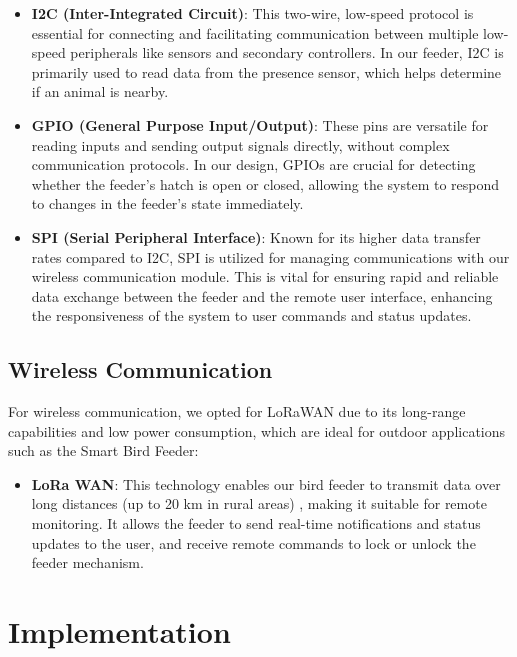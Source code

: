 \documentclass[12pt,a4paper]{article}
\begin{document}
    \begin{itemize}
        \item \textbf{I2C (Inter-Integrated Circuit)}: This two-wire, low-speed protocol is essential for connecting and facilitating communication between multiple low-speed peripherals like sensors and secondary controllers. In our feeder, I2C is primarily used to read data from the presence sensor, which helps determine if an animal is nearby.
        \item \textbf{GPIO (General Purpose Input/Output)}: These pins are versatile for reading inputs and sending output signals directly, without complex communication protocols. In our design, GPIOs are crucial for detecting whether the feeder's hatch is open or closed, allowing the system to respond to changes in the feeder's state immediately.
        \item \textbf{SPI (Serial Peripheral Interface)}: Known for its higher data transfer rates compared to I2C, SPI is utilized for managing communications with our wireless communication module. This is vital for ensuring rapid and reliable data exchange between the feeder and the remote user interface, enhancing the responsiveness of the system to user commands and status updates.
    \end{itemize}
    

    
    \subsection{Wireless Communication}
    For wireless communication, we opted for LoRaWAN due to its long-range capabilities and low power consumption, which are ideal for outdoor applications such as the Smart Bird Feeder:
    
    \begin{itemize}
        \item \textbf{LoRa WAN}: This technology enables our bird feeder to transmit data over long distances (up to 20 km in rural areas) \cite{wikipedia_lora}, making it suitable for remote monitoring. It allows the feeder to send real-time notifications and status updates to the user, and receive remote commands to lock or unlock the feeder mechanism.
    \end{itemize}
    
\section{Implementation}
\end{document}
